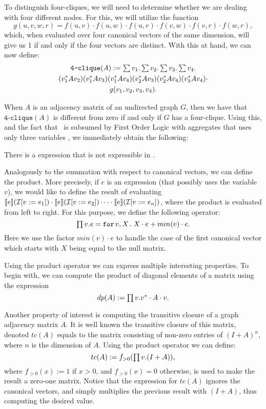 To distinguish four-cliques, we will need to determine whether we are dealing with four different nodes. For this, we will utilize the function $$g(u,v,w,r)=f(u,v)\cdot f(u,w)\cdot f(u,r)\cdot f(v,w)\cdot f(v,r)\cdot f(w,r),$$
which, when evaluated over four canonical vectors of the same dimension, will give us 1 if and only if the four vectors are distinct. With this at hand, we can now define:		
\begin{multline*}
\texttt{4-clique}(A) := \textstyle\sum v_1.\textstyle\sum v_2. \textstyle\sum v_3. \textstyle\sum v_4.\\ (v_1^*Av_2)(v_1^*Av_3)(v_1^*Av_4)(v_2^*Av_3)(v_2^*Av_4)(v_3^*Av_4) \cdot
\\g(v_1,v_2,v_3,v_4).
\end{multline*}

When $A$ is an adjacency matrix of an undirected graph $G$, then we have that $\texttt{4-clique}(A)$ is different from zero if and only if $G$ has a four-clique. Using this, and the fact that \lang\ is subsumed by First Order Logic with aggregates that uses only three variables \cite{matlang}, we immediately obtain the following:

\begin{corollary}
There is a  \langfor expression that is not expressible in \lang.
\end{corollary}

\medskip

 Analogously to the summation with respect to canonical vectors, we can define the product. More precisely, 
if $e$ is an \langfor expression (that possibly uses the variable $v$), we would like to define the result of evaluating $\llbracket e \rrbracket(\mathcal{I}[v := e_1]) \cdot \llbracket e \rrbracket(\mathcal{I}[v := e_2])\cdots \cdot \llbracket e \rrbracket(\mathcal{I}[v := e_n])$, where the product is evaluated from left to right. For this purpose, we define the following operator:
$$\textstyle\prod v. e=\texttt{for}\, v,X \texttt{.}\, X\cdot e + min(v)\cdot e.$$
Here we use the factor $min(v)\cdot e$ to handle the case of the first canonical vector which starts with $X$ being equal to the null matrix. 

Using the product operator we can express multiple interesting properties. To begin with, we can compute the product of diagonal elements of a matrix using the expression $$dp(A) := \textstyle\prod v. v^*\cdot A \cdot v.$$

Another property of interest is computing the transitive closure of a graph adjacency matrix $A$. It is well known the transitive closure of this matrix, denoted $tc(A)$ equals to the matrix consisting of non-zero entries of $(I + A)^n$, where $n$ is the dimension of $A$. Using the product operator we can define:
$$tc(A) := f_{>0}(\textstyle\prod v. (I + A)),$$
where $f_{>0}(x) := 1$ if $x>0$, and $f_{>0}(x) = 0$ otherwise, is used to make the result a zero-one matrix. Notice that the expression for $tc(A)$ ignores the canonical vectors, and simply multiplies the previous result with $(I + A)$, thus computing the desired value.


